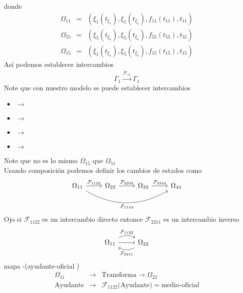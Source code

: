 \documentclass[]{article}
\begin{document}
donde 
\begin{eqnarray}
	\Omega_{11}&=& \left(  \xi_1(t_{\xi_1}), \xi_1(t_{\xi_1}), f_{11}( t_{11}), t_{11} \right)\\
	\Omega_{55}&=& \left(  \xi_5(t_{\xi_5}), \xi_5(t_{\xi_5}), f_{55}(t_{55}), t_{55} \right)\\
	\Omega_{15}&=& \left(  \xi_1(t_{\xi_1}), \xi_5(t_{\xi_5}), f_{15}(t_{15}), t_{15} \right)
\end{eqnarray}
As\'i podemos establecer intercambios 
\begin{equation}
	\Gamma_1 \xrightarrow{{\mathcal{\tilde{F}}_{11}}}\Gamma_1
\end{equation}
Note que con nuestro modelo se puede establecer intercambios

\begin{itemize}[label=$\mapsto$]
\item {} $\longrightarrow$  \\
\item  {} $\longrightarrow$ \\
\item  {} $\longrightarrow$  \\
\item  {}$\longrightarrow$ 
\end{itemize}
Note que no es lo mismo $\Omega_{15}$ que $\Omega_{51}$ \\
Usando composici\'on podemos definir los cambios de estados como
\begin{equation}
\begin{tikzcd}
\Omega_{11} \arrow[bend right]{rrr}[swap]{\mathcal{F}_{1144}} \arrow{r}{\mathcal{F}_{1122}}
&\Omega_{22}\arrow{r}{\mathcal{F}_{2233}}
&\Omega_{33} \arrow{r}{\mathcal{F}_{3344}}
&\Omega_{44}
\end{tikzcd}
\end{equation}
Ojo si $\mathcal{F}_{1122}$ es un intercambio directo entonce $\mathcal{F}_{2211}$ es un intercambio inverso
\begin{equation}
	\begin{tikzcd}
	\Omega_{11}\arrow[bend left]{r}{\mathcal{F}_{1122}}\arrow{r}&\Omega_{22}\arrow[bend left]{l}{\mathcal{F}_{2211}}
	\end{tikzcd}
\end{equation} 
mapa -(ayudante-oficial )
\begin{eqnarray*}
	\Omega_{11}&\longrightarrow&\text{Transforma}\longrightarrow\Omega_{22}\\
	\text{Ayudante}&\longrightarrow&\mathcal{F}_{1122}\text{(Ayudante)}=\text{medio-oficial}
\end{eqnarray*}
\end{document}

